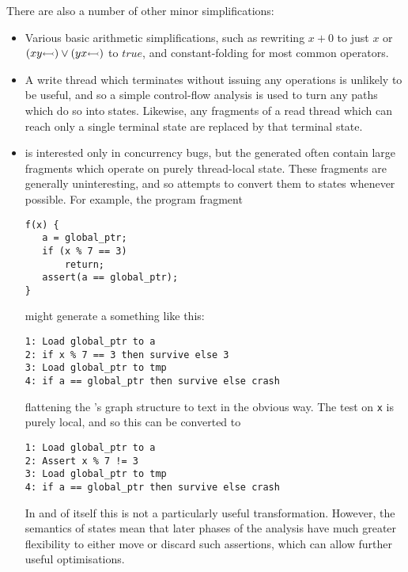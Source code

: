 There are also a number of other minor simplifications:

\begin{itemize}
\item
  Various basic arithmetic simplifications, such as rewriting $x + 0$
  to just $x$ or $(x y {\leftarrowtail} ) \vee (y x {\leftarrowtail} )$ to
  $true$, and constant-folding for most common operators.
\item
  A write thread {\StateMachine} which terminates without issuing any
   operations is unlikely to be useful, and so a simple
  control-flow analysis is used to turn any paths which do so into
   states.  Likewise, any fragments of a read thread
        {\StateMachine} which can reach only a single terminal state
        are replaced by that terminal state.
\item
  {\Technique} is interested only in concurrency bugs, but the
  {\StateMachines} generated often contain large fragments which
  operate on purely thread-local state.  These fragments are generally
  uninteresting, and so {\technique} attempts to convert them to
   states whenever possible.  For example, the program
  fragment

\begin{verbatim}
f(x) {
   a = global_ptr;
   if (x % 7 == 3)
       return;
   assert(a == global_ptr);
}
\end{verbatim}

   might generate a {\StateMachine} something like this:

\begin{verbatim}
1: Load global_ptr to a
2: if x % 7 == 3 then survive else 3
3: Load global_ptr to tmp
4: if a == global_ptr then survive else crash
\end{verbatim}

   flattening the {\StateMachine}'s graph structure to text in the
   obvious way.  The test on \verb|x| is purely local, and so this
   {\StateMachine} can be converted to

\begin{verbatim}
1: Load global_ptr to a
2: Assert x % 7 != 3
3: Load global_ptr to tmp
4: if a == global_ptr then survive else crash
\end{verbatim}

   In and of itself this is not a particularly useful transformation.
   However, the semantics of  states mean that later
   phases of the analysis have much greater flexibility to either move
   or discard such assertions, which can allow further useful
   optimisations.  
\end{itemize}

